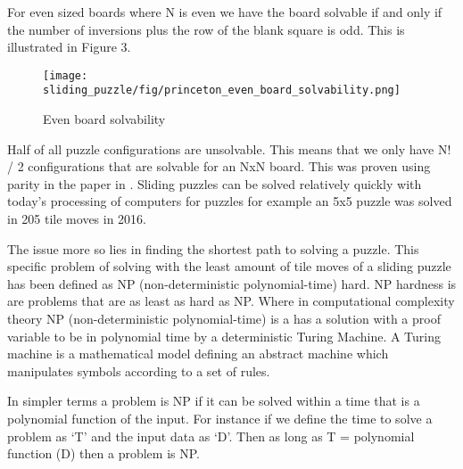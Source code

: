 For even sized boards where N is even we have the board solvable if and only if the number of
inversions plus the row of the blank square is odd. This is illustrated in Figure 3.

\begin{figure}[!htb]
	\centering
	\texttt{[image: sliding\_puzzle/fig/princeton\_even\_board\_solvability.png]}
	\caption{Even board solvability \cite{princeton_8puzzle_assignment}}
	\label{fig:sol_even_board}
\end{figure}

Half of all puzzle configurations are unsolvable. \cite{Notes_15_puzzle} This means that we only have N! / 2 configurations
that are solvable for an NxN board. This was proven using parity in the paper in \cite{Notes_15_puzzle}. Sliding puzzles
can be solved relatively quickly with today’s processing of computers for puzzles for example an 5x5
puzzle was solved in 205 tile moves in 2016. \cite{Domain_cube_forum}

The issue more so lies in finding the shortest path to solving a puzzle. This specific problem of solving
with the least amount of tile moves of a sliding puzzle has been defined as NP (non-deterministic polynomial-time) hard. NP hardness is are problems that are as least as hard as NP.
Where in computational complexity theory NP (non-deterministic polynomial-time) is a has a solution
with a proof variable to be in polynomial time by a deterministic Turing Machine. A Turing machine is
a mathematical model defining an abstract machine which manipulates symbols according to a set of
rules. \cite{Computation_finite_and_infinite_machines}

In simpler terms a problem is NP if it can be solved within a time that is a polynomial function of the
input. For instance if we define the time to solve a problem as ‘T’ and the input data as ‘D’. Then as
long as T = polynomial function (D) then a problem is NP.